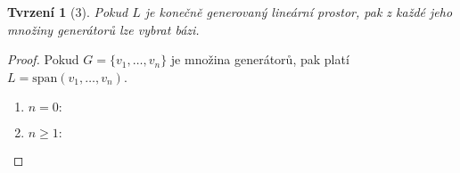 \documentclass[a4paper,11pt]{article}
\newtheorem{theorem}{Tvrzení}[section]
\theoremstyle{remark}
\theoremstyle{definition}
\begin{document}
		\begin{theorem}[3]
			Pokud $L$ je konečně generovaný lineární prostor, pak z každé jeho množiny generátorů lze vybrat bázi.
		\end{theorem}
		\begin{proof}
			Pokud $G=\{v_1,\dots,v_n\}$ je množina generátorů, pak platí $L=\mathrm{span}(v_1,\dots,v_n)$.
			\begin{enumerate}[label=(\alph*)]
				
				\item $n=0:$ 
				
				\item $n\geq 1:$
				
			\end{enumerate}
		\end{proof}
	
\end{document}
